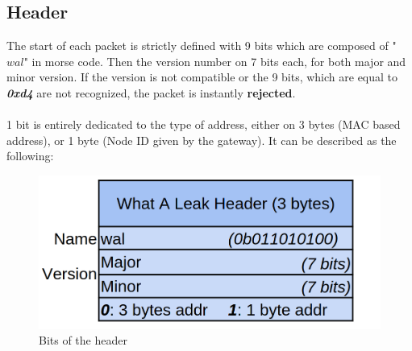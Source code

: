 \documentclass[
	a4paper,
	10pt,
	unnumberedsections,
	twoside,
]{LTJournalArticle}
\begin{document}
\subsection{Header}
The start of each packet is strictly defined with 9 bits which are composed of "$wal$" in morse code. Then the version number on 7 bits each, for both major and minor version. If the version is not compatible or the 9 bits, which are equal to \textbf{\textit{0xd4}} are not recognized, the packet is instantly \textbf{rejected}.
\\
\\
1 bit is entirely dedicated to the type of address, either on 3 bytes (MAC based address), or 1 byte (Node ID given by the gateway). It can be described as the following:
\begin{figure}[H]
    \centering
    \includegraphics[width=0.9\linewidth]{img/wal_header_bits.png}
    \caption{Bits of the header}
    \label{fig:header_bits}
\end{figure}
\end{document}
